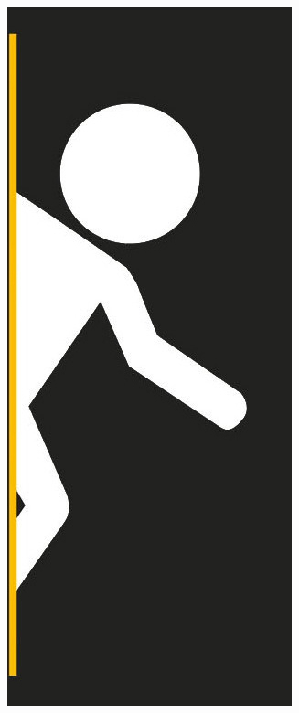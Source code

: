 \documentclass[a5paper,12pt,twoside]{article}
\begin{document}
\pagecolor{CoverBackground}
\thispagestyle{empty}

\vspace*{0.4cm}
\begin{figure}[H]
\centering
    \includegraphics[scale=0.6]{FrontCover.jpg}
\end{figure}


\newpage
\thispagestyle{empty}
\null


\newpage
\thispagestyle{empty}
\null

\end{document}
